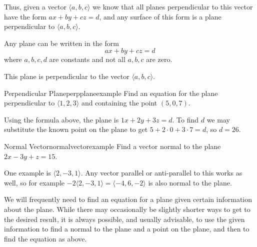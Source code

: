 Thus, given a vector $\langle a,b,c\rangle$ we know that all planes
perpendicular to this vector have the form $ax+by+cz=d$, and any surface
of this form is a plane perpendicular to $\langle a,b,c\rangle$.

\begin{formulabox}
Any plane can be written in the form
\[
ax + by + cz = d
\]
where $a, b, c, d$ are constants and not all $a, b, c$ are zero. 

This plane is perpendicular to the vector $\langle a,b,c \rangle$. 
\end{formulabox}

\begin{example}{Perpendicular Plane}{perpplaneexample}
Find an equation for the plane perpendicular to $\langle 1,2,3\rangle$
and containing the point $(5,0,7)$.
\end{example}
\begin{solution}
Using the formula above, 
the plane is $1x+2y+3z=d$. To find $d$ we may substitute
the known point on the plane to get $5+2\cdot0+3\cdot7=d$, so $d=26$.
\end{solution}

\begin{example}{Normal Vector}{normalvectorexample}
Find a vector normal to the plane $2x-3y+z=15$.
\end{example}
\begin{solution}
One example is $\langle 2, -3,1\rangle$. Any vector parallel or
anti-parallel to this works as well, so for example
$-2\langle 2, -3,1\rangle=\langle -4,6,-2\rangle$ is also normal to the plane.
\end{solution}

We will frequently need to find an equation for a plane given certain
information about the plane. While there may occasionally be slightly
shorter ways to get to the desired result, it is always possible, and
usually advisable, to use the given information to find a normal to
the plane and a point on the plane, and then to find the equation as
above. 

